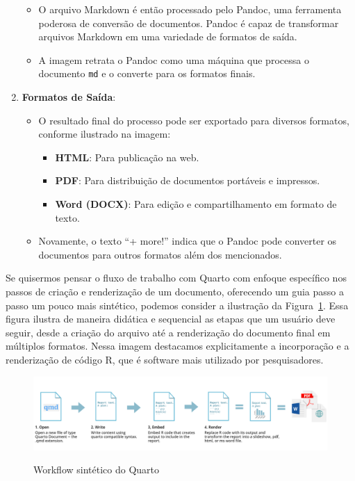 \documentclass[
  a4paper,
]{book}
\providecommand{\tightlist}{%
  \setlength{\itemsep}{0pt}\setlength{\parskip}{0pt}}\usepackage{longtable,booktabs,array}
\begin{document}
\begin{tcolorbox}
\begin{enumerate}
  \begin{itemize}
  \tightlist
  \item
    O arquivo Markdown é então processado pelo Pandoc, uma ferramenta
    poderosa de conversão de documentos. Pandoc é capaz de transformar
    arquivos Markdown em uma variedade de formatos de saída.
  \item
    A imagem retrata o Pandoc como uma máquina que processa o documento
    \texttt{md} e o converte para os formatos finais.
  \end{itemize}
\item
  \textbf{Formatos de Saída}:

  \begin{itemize}
  \tightlist
  \item
    O resultado final do processo pode ser exportado para diversos
    formatos, conforme ilustrado na imagem:

    \begin{itemize}
    \tightlist
    \item
      \textbf{HTML}: Para publicação na web.
    \item
      \textbf{PDF}: Para distribuição de documentos portáveis e
      impressos.
    \item
      \textbf{Word (DOCX)}: Para edição e compartilhamento em formato de
      texto.
    \end{itemize}
  \item
    Novamente, o texto ``+ more!'' indica que o Pandoc pode converter os
    documentos para outros formatos além dos mencionados.
  \end{itemize}
\end{enumerate}

\end{tcolorbox}

Se quisermos pensar o fluxo de trabalho com Quarto com enfoque
específico nos passos de criação e renderização de um documento,
oferecendo um guia passo a passo um pouco mais sintético, podemos
consider a ilustração da Figura~\ref{fig-qmd-workflow}. Essa figura
ilustra de maneira didática e sequencial as etapas que um usuário deve
seguir, desde a criação do arquivo até a renderização do documento final
em múltiplos formatos. Nessa imagem destacamos explicitamente a
incorporação e a renderização de código R, que é software mais utilizado
por pesquisadores.

\begin{figure}

\href{https://ucsbcarpentry.github.io/Reproducible-Publications-with-RStudio-Quarto/02-quarto/03-quarto-documents/index.html}{\includegraphics{img/qmd-workflow.png}}

\caption{\label{fig-qmd-workflow}Workflow sintético do Quarto}

\end{figure}%
\end{document}
